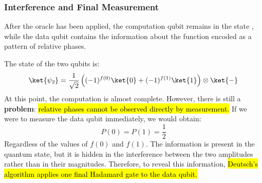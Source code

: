 \subsubsection{Interference and Final Measurement}\label{ex:interference-and-final-measurement}

After the oracle has been applied, the computation qubit remains in the state \ket{-}, while the data qubit contains the information about the function encoded as a pattern of relative phases.

\highspace
The state of the two qubits is:
\begin{equation*}
    \ket{\psi_2} = \frac{1}{\sqrt{2}} \left( (-1)^{f(0)}\ket{0} + (-1)^{f(1)}\ket{1} \right) \otimes \ket{-}
\end{equation*}
\textcolor{Red2}{} At this point, the computation is almost complete. However, there is still a \textbf{problem}: \hl{relative phases cannot be observed directly by measurement.} If we were to measure the data qubit immediately, we would obtain:
\begin{equation*}
    P(0) = P(1) = \frac{1}{2}
\end{equation*}
Regardless of the values of $f(0)$ and $f(1)$. The information is present in the quantum state, but it is hidden in the interference between the two amplitudes rather than in their magnitudes. Therefore, to reveal this information, \hl{Deutsch's algorithm applies one final Hadamard gate to the data qubit.}

